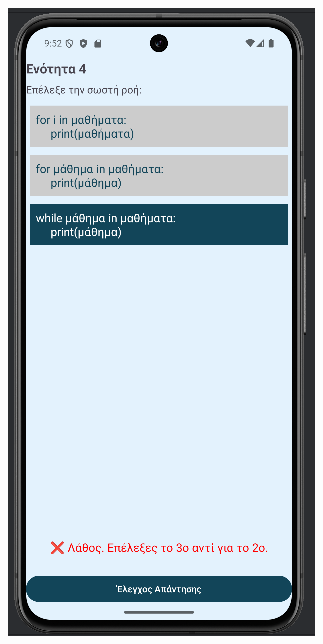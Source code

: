 \documentclass[11pt]{report}
\begin{document}
\begin{figure}[H]
  \centering
  \begin{minipage}[b]{0.45\textwidth}
    \includegraphics[width=\linewidth, height=0.35\textheight, keepaspectratio]{Figures/εικόνα (20).png}

\end{minipage}
\end{figure}
\end{document}
